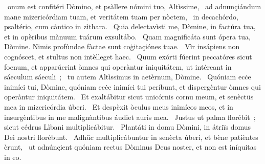 { }
{%
~onum est confitéri Dòmino, et psàllere nómini tuo, Altìssime, 
~ad adnunçiándum mane mizericórdiam tuam, et veritátem tuam per nòctem, 
~in decachórdo, psaltério, cum càntico in zìthara. 
~Quia delectavìsti me, Dòmine, in factúra tua, et in opèribus mànuum tuárum exsultábo. 
~Quam magnificáta sunt ópera tua, Dòmine. Nimis profùndae fàctae sunt coġitaçiónes tuae. 
~Vìr insápiens non cognóscet, et stultus non intèlleget haec. 
~Quum exórti fúerint peccatóres sicut foenum, et apparúerint òmnes qui operàntur iniquitátem, ut intéreant in sáeculum sáeculi~; 
~tu autem Altìssimus in aetèrnum, Dòmine. 
~Quóniam ecċe inimíci tui, Dòmine, quóniam ecċe inimíci tui períbunt, et dispergèntur òmnes qui operàntur iniquitátem. 
~Et exaltábitur sicut unicórnis cornu meum, et senèctüs mea in mizericórdia úberi. 
~Et despèxit òculus meus inimícos meos, et in insurgèntibus in me malignàntibus áudiet auris mea. 
~Justus ut palma florébit~; sicut cédrus Lìbani multiplicábitur. 
~Plantáti in domu Dòmini, in átriïs domus Dei nostri florébunt. 
~Adhüc multiplicábuntur in senècta úberi, et bène patièntes èrunt, 
~ut adnúnçient quóniam rectus Dòminus Deus noster, et non est iníquitas in eo. 
}
